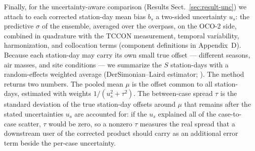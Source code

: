 Finally, for the uncertainty-aware comparison (Results Sect.~\ref{sec:result-unc}) we attach to each corrected station-day mean bias $b_s$ a two-sided uncertainty $u_s$: the predictive $\sigma$ of the ensemble, averaged over the overpass, on the OCO-2 side, combined in quadrature with the TCCON measurement, temporal variability, harmonization, and collocation terms (component definitions in Appendix~D). Because each station-day may carry its own small true offset — different seasons, air masses, and site conditions — we summarize the $S$ station-days with a random-effects weighted average (DerSimonian--Laird estimator; \citealp{dersimonian1986meta}). The method returns two numbers. The pooled mean $\mu$ is the offset common to all station-days, estimated with weights $1/(u_s^2 + \tau^2)$. The between-case spread $\tau$ is the standard deviation of the true station-day offsets around $\mu$ that remains after the stated uncertainties $u_s$ are accounted for: if the $u_s$ explained all of the case-to-case scatter, $\tau$ would be zero, so a nonzero $\tau$ measures the real spread that a downstream user of the corrected product should carry as an additional error term beside the per-case uncertainty.

